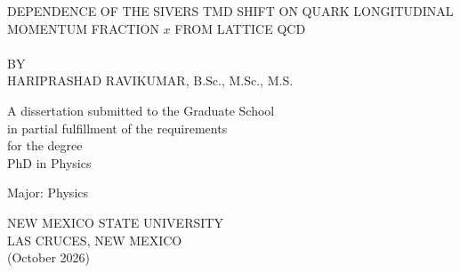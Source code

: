 
\vspace*{0.5in} %
\begin{center} %
DEPENDENCE OF THE SIVERS TMD SHIFT ON QUARK LONGITUDINAL MOMENTUM FRACTION $x$ FROM LATTICE QCD\\~\\
\vspace{0.075in}
BY\\[10pt]
HARIPRASHAD RAVIKUMAR, B.Sc., M.Sc., M.S.
\end{center}

\vspace{.65in}
\begin{center}
A dissertation submitted to the Graduate School\\[-10pt]
in partial fulfillment of the requirements\\[-10pt]
for the degree \\[-10pt]
PhD in Physics
\end{center}

\vspace{.65in}
\begin{center}
Major: Physics
\end{center}

\vspace{.65in}
\begin{center}
NEW MEXICO STATE UNIVERSITY\\[-10pt]
LAS CRUCES, NEW MEXICO\\[-10pt]
(October 2026)
\end{center}
